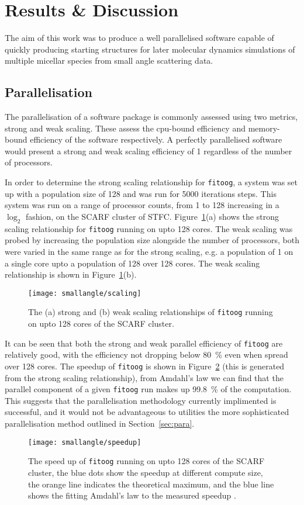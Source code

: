 \section{Results \& Discussion}
The aim of this work was to produce a well parallelised software capable of quickly producing starting structures for later molecular dynamics simulations of multiple micellar species from small angle scattering data.

\subsection{Parallelisation}
The parallelisation of a software package is commonly assessed using two metrics, strong and weak scaling.
These assess the cpu-bound efficiency and memory-bound efficiency of the software respectively.
A perfectly parallelised software would present a strong and weak scaling efficiency of 1 regardless of the number of processors.

In order to determine the strong scaling relationship for \texttt{fitoog}, a system was set up with a population size of 128 and was run for 5000 iterations steps.
This system was run on a range of processor counts, from 1 to 128 increasing in a $\log_2$ fashion, on the SCARF cluster of STFC.
Figure~\ref{fig:scale}(a) shows the strong scaling relationship for \texttt{fitoog} running on upto 128 cores.
The weak scaling was probed by increasing the population size alongside the number of processors, both were varied in the same range as for the strong scaling, e.g. a population of 1 on a single core upto a population of 128 over 128 cores.
The weak scaling relationship is shown in Figure~\ref{fig:scale}(b).
%
\begin{figure}
    \centering
    \texttt{[image: smallangle/scaling]}
    \caption{The (a) strong and (b) weak scaling relationships of \texttt{fitoog} running on upto 128 cores of the SCARF cluster.}
    \label{fig:scale}
\end{figure}
%

It can be seen that both the strong and weak parallel efficiency of \texttt{fitoog} are relatively good, with the efficiency not dropping below \SI{80}{\percent} even when spread over 128 cores.
The speedup of \texttt{fitoog} is shown in Figure~\ref{fig:speedup} (this is generated from the strong scaling relationship), from Amdahl's law \cite{amdahl_validity_1967} we can find that the parallel component of a given \texttt{fitoog} run makes up \SI{99.8}{\percent} of the computation.
This suggests that the parallelisation methodology currently implimented is successful, and it would not be advantageous to utilities the more sophisticated parallelisation method outlined in Section~\ref{sec:para}.
%
\begin{figure}
    \centering
    \texttt{[image: smallangle/speedup]}
    \caption{The speed up of \texttt{fitoog} running on upto 128 cores of the SCARF cluster, the blue dots show the speedup at different compute size, the orange line indicates the theoretical maximum, and the blue line shows the fitting Amdahl's law to the measured speedup \cite{amdahl_validity_1967}.}
    \label{fig:speedup}
\end{figure}
%

